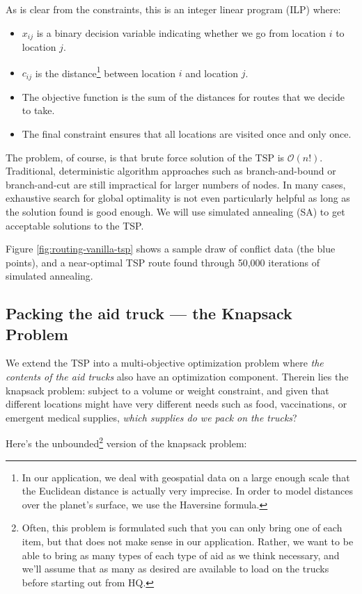 \documentclass{article} %
\begin{document}
As is clear from the constraints, this is an integer linear program (ILP) where:

\begin{itemize}
  \item $x_{ij}$ is a binary decision variable indicating whether we go from location $i$ to location $j$.
  \item $c_{ij}$ is the distance\footnote{In our application, we deal with geospatial data on a large enough scale that the Euclidean distance is actually very imprecise. In order to model distances over the planet's surface, we use the Haversine formula.} between location $i$ and location $j$.
  \item The objective function is the sum of the distances for routes that we decide to take.
  \item The final constraint ensures that all locations are visited once and only once.
\end{itemize}

The problem, of course, is that brute force solution of the TSP is $\mathcal{O}$$(n!)$. Traditional, deterministic
algorithm approaches such as branch-and-bound or branch-and-cut are still impractical for larger numbers of nodes.
In many cases, exhaustive search for global optimality is not even particularly helpful as long as the solution
found is good enough. We will use simulated annealing (SA) to get acceptable solutions to the TSP.

Figure \ref{fig:routing-vanilla-tsp} shows a sample draw of conflict data (the blue points), and a near-optimal TSP route found through 50,000 iterations of simulated annealing.

\subsection{Packing the aid truck --- the Knapsack Problem}

We extend the TSP into a multi-objective optimization problem
where \emph{the contents of the aid trucks} also have an optimization component. Therein lies
the knapsack problem: subject to a volume or weight constraint, and given that different locations
might have very different needs such as food, vaccinations, or emergent medical supplies, \emph{which
supplies do we pack on the trucks}?

Here's the unbounded\footnote{Often, this problem is formulated such that you can only bring one of each item, but that does not make sense in our application. Rather, we want to be able to bring as many types of each type of aid as we think necessary, and we'll assume that as many as desired are available to load on the trucks before starting out from HQ.} version of the knapsack problem:
\end{document}
